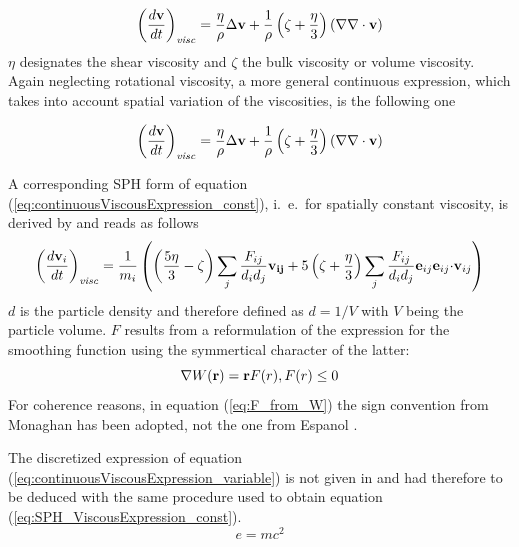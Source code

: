 \documentclass{report}
\begin{document}
\begin{equation}
\label{eq:continuousViscousExpression_const}
\left(\frac{d{\bf v}}{dt}\right)_{\mathit{visc}}=\frac{\eta}{\rho}\Delta {\bf v}+\frac{1}{\rho}\left(\zeta +\frac{\eta}{3}\right)\left(\nabla \nabla \cdot {\bf v}\right)
\end{equation}
$\eta$ designates the shear viscosity and $\zeta$ the bulk viscosity or volume viscosity.
Again neglecting rotational viscosity, a more general continuous expression, which takes into account spatial variation of the viscosities, is the following one


\begin{equation}
\label{eq:continuousViscousExpression_variable}
\left(\frac{d{\bf v}}{dt}\right)_{\mathit{visc}}=\frac{\eta}{\rho}\Delta {\bf v}+\frac{1}{\rho}\left(\zeta +\frac{\eta}{3}\right)\left(\nabla \nabla \cdot {\bf v}\right)
\end{equation}


A corresponding SPH form of equation (\ref{eq:continuousViscousExpression_const}), i.\ e.\ for spatially constant viscosity, is derived by \cite{Espanol2003} and reads as follows
\begin{equation}
\label{eq:SPH_ViscousExpression_const}
\left(\frac{d{\bf v}_i}{dt}\right)_{\mathit{visc}}=\frac{1}{m_i}\left( \left(\frac{5\eta}{3}-\zeta\right)\sum_j\frac{F_{ij}}{d_i d_j}{\bf v_{ij}}+5\left(\zeta+\frac{\eta}{3}\right) \sum_j\frac{F_{ij}}{d_i d_j}{\bf e}_{ij} {\bf e}_{ij}{\bf \cdot v}_{ij}\right)
\end{equation}
$d$ is the particle density and therefore defined as $d=1/V$ with $V$ being the particle volume. $F$ results from a reformulation of the expression for the smoothing function using the symmertical character of the latter:
\begin{equation}
 \label{eq:F_from_W}
\nabla W({\bf r})={\bf r} F(r), F(r)\leq 0
\end{equation}
For coherence reasons, in equation (\ref{eq:F_from_W}) the sign convention from Monaghan \cite{Monaghan2005} has been adopted, not the one from Espanol \cite{Espanol2003}.


The discretized expression of equation (\ref{eq:continuousViscousExpression_variable}) is not given in \cite{Espanol2003} and had therefore to be deduced with the same procedure used to obtain equation (\ref{eq:SPH_ViscousExpression_const}).
\begin{equation}
\label{eq:SPH_ViscousExpression_variable}
e=mc^2
\end{equation}
\end{document}
